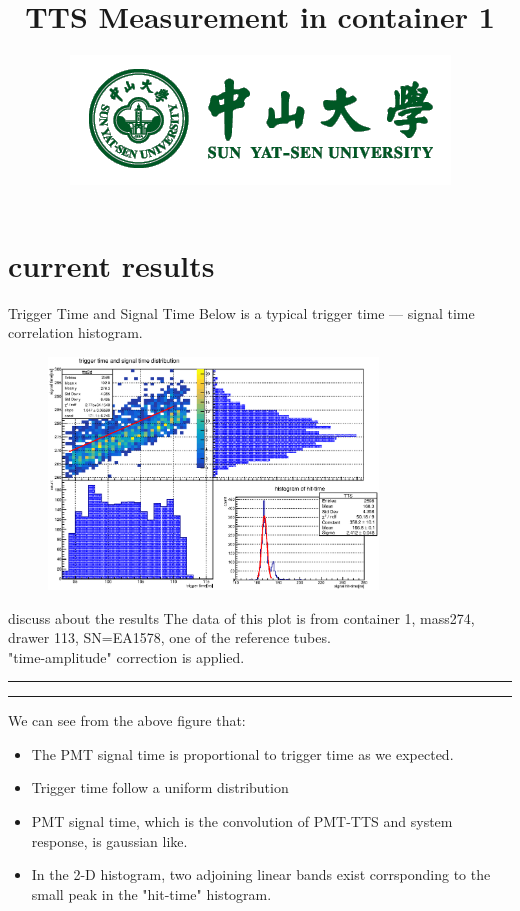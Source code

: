\documentclass[11pt,compress,xcolor=x11names,UTF8]{beamer}
\title{TTS Measurement in container 1 }
\author[Rong. Zhao]{Email：zhaor25@mail2.sysu.edu.cn \and  } %
\institute[Sun Yat-Sen University]{School of Physics\and } %
\date[\today]{\includegraphics[width=.5\textwidth]{logo}}
\begin{document}
\maketitle


\section{current results}


\begin{frame}{Trigger Time and Signal Time}
Below is a typical \alert{trigger time --- signal time} correlation histogram.
\begin{figure}
\centering
\includegraphics[width=0.78\textwidth]{typical_hittime} %
\end{figure}

\end{frame}
\begin{frame}{discuss about the results}
The data of this plot is from container 1, mass274, drawer 113, SN=EA1578, one of the reference tubes.\\
"time-amplitude" correction is applied.
\vspace{.5cm}
\hrule{}
\hrule{}
\vspace{.5cm}

We can see from the above figure that:
\begin{itemize}
\item The PMT signal time is proportional to trigger time as we expected.
\item Trigger time follow a uniform distribution 
\item PMT signal time, which is the convolution of PMT-TTS and system response, is gaussian like.
\item In the 2-D histogram, two adjoining linear bands exist corrsponding to the small peak in the "hit-time" histogram.
\end{itemize}
\end{frame}
\end{document}
